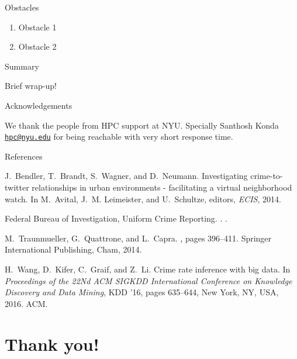 \documentclass[10pt,ignorenonframetext,]{beamer}
\begin{document}
\begin{frame}{%
\protect\hypertarget{obstacles}{%
Obstacles}}

\begin{enumerate}
[1.]
\item
  Obstacle 1
\item
  Obstacle 2
\end{enumerate}

\end{frame}

\begin{frame}{%
\protect\hypertarget{summary}{%
Summary}}

Brief wrap-up!

\end{frame}

\begin{frame}{%
\protect\hypertarget{acknowledgements}{%
Acknowledgements}}

We thank the people from HPC support at NYU. Specially Santhosh Konda
\href{mailto:hpc@nyu.edu}{\nolinkurl{hpc@nyu.edu}} for being reachable
with very short response time.

\end{frame}

\begin{frame}{%
\protect\hypertarget{references}{%
References}}

\begin{thebibliography}{1}

J.~Bendler, T.~Brandt, S.~Wagner, and D.~Neumann.
\newblock Investigating crime-to-twitter relationships in urban environments -
  facilitating a virtual neighborhood watch.
\newblock In M.~Avital, J.~M. Leimeister, and U.~Schultze, editors, {\em ECIS},
  2014.

{Federal Bureau of Investigation, Uniform Crime Reporting}.
.
.

M.~Traunmueller, G.~Quattrone, and L.~Capra.
, pages 396--411.
\newblock Springer International Publishing, Cham, 2014.
\end{thebibliography}

\end{frame}

\begin{frame}

\begin{thebibliography}{1}
H.~Wang, D.~Kifer, C.~Graif, and Z.~Li.
\newblock Crime rate inference with big data.
\newblock In {\em Proceedings of the 22Nd ACM SIGKDD International Conference
  on Knowledge Discovery and Data Mining}, KDD '16, pages 635--644, New York,
  NY, USA, 2016. ACM.

\end{thebibliography}

\end{frame}

\hypertarget{thank-you}{%
\section{Thank you!}\label{thank-you}}
\end{document}
